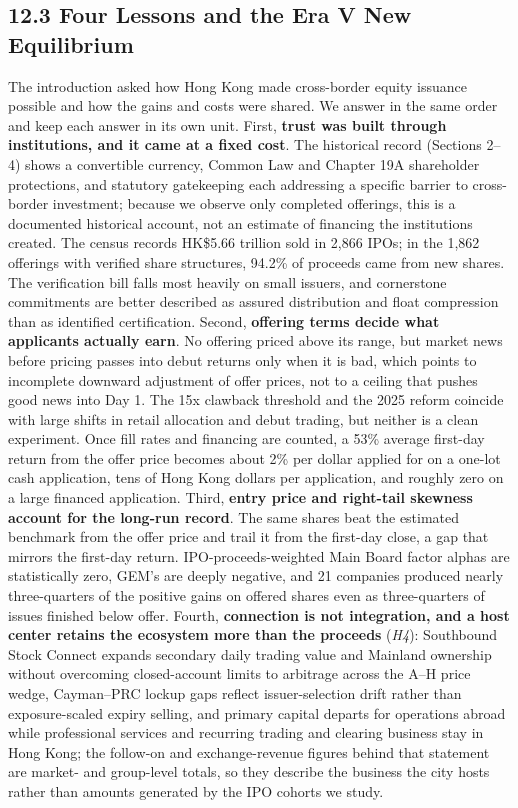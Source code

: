 \documentclass[11pt,letterpaper]{article}
\begin{document}
\subsection*{\texorpdfstring{12.3 Four Lessons and the Era V New Equilibrium}{12.3 Four Lessons and the Era V New Equilibrium}}
The introduction asked how Hong Kong made cross-border equity issuance possible and how the gains and costs were shared. We answer in the same order and keep each answer in its own unit. First, \textbf{trust was built through institutions, and it came at a fixed cost}. The historical record (Sections 2–4) shows a convertible currency, Common Law and Chapter 19A shareholder protections, and statutory gatekeeping each addressing a specific barrier to cross-border investment; because we observe only completed offerings, this is a documented historical account, not an estimate of financing the institutions created. The census records HK\$5.66 trillion sold in 2,866 IPOs; in the 1,862 offerings with verified share structures, 94.2\% of proceeds came from new shares. The verification bill falls most heavily on small issuers, and cornerstone commitments are better described as assured distribution and float compression than as identified certification. Second, \textbf{offering terms decide what applicants actually earn}. No offering priced above its range, but market news before pricing passes into debut returns only when it is bad, which points to incomplete downward adjustment of offer prices, not to a ceiling that pushes good news into Day 1. The 15x clawback threshold and the 2025 reform coincide with large shifts in retail allocation and debut trading, but neither is a clean experiment. Once fill rates and financing are counted, a 53\% average first-day return from the offer price becomes about 2\% per dollar applied for on a one-lot cash application, tens of Hong Kong dollars per application, and roughly zero on a large financed application. Third, \textbf{entry price and right-tail skewness account for the long-run record}. The same shares beat the estimated benchmark from the offer price and trail it from the first-day close, a gap that mirrors the first-day return. IPO-proceeds-weighted Main Board factor alphas are statistically zero, GEM's are deeply negative, and 21 companies produced nearly three-quarters of the positive gains on offered shares even as three-quarters of issues finished below offer. Fourth, \textbf{connection is not integration, and a host center retains the ecosystem more than the proceeds} (\textit{H4}): Southbound Stock Connect expands secondary daily trading value and Mainland ownership without overcoming closed-account limits to arbitrage across the A–H price wedge, Cayman–PRC lockup gaps reflect issuer-selection drift rather than exposure-scaled expiry selling, and primary capital departs for operations abroad while professional services and recurring trading and clearing business stay in Hong Kong; the follow-on and exchange-revenue figures behind that statement are market- and group-level totals, so they describe the business the city hosts rather than amounts generated by the IPO cohorts we study.
\end{document}
